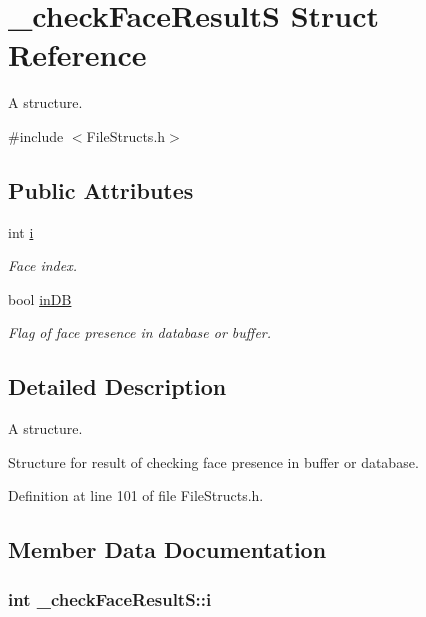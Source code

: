 \hypertarget{struct__check_face_result_s}{}\section{\+\_\+check\+Face\+ResultS Struct Reference}
\label{struct__check_face_result_s}


A structure.  




{\ttfamily \#include $<$File\+Structs.\+h$>$}

\subsection*{Public Attributes}
\begin{DoxyCompactItemize}
\item 
int \hyperlink{struct__check_face_result_s_a016b1da6b53d2a9fe2baf9a88b0699aa}{i}
\begin{DoxyCompactList}\small\item\em Face index. \end{DoxyCompactList}\item 
bool \hyperlink{struct__check_face_result_s_aa7353d6109af6ce0a9b2c8c07e09a48b}{in\+DB}
\begin{DoxyCompactList}\small\item\em Flag of face presence in database or buffer. \end{DoxyCompactList}\end{DoxyCompactItemize}


\subsection{Detailed Description}
A structure. 

Structure for result of checking face presence in buffer or database. 

Definition at line 101 of file File\+Structs.\+h.



\subsection{Member Data Documentation}
\subsubsection[{\texorpdfstring{i}{i}}]{\setlength{\rightskip}{0pt plus 5cm}int \+\_\+check\+Face\+Result\+S\+::i}\hypertarget{struct__check_face_result_s_a016b1da6b53d2a9fe2baf9a88b0699aa}{}\label{struct__check_face_result_s_a016b1da6b53d2a9fe2baf9a88b0699aa}


